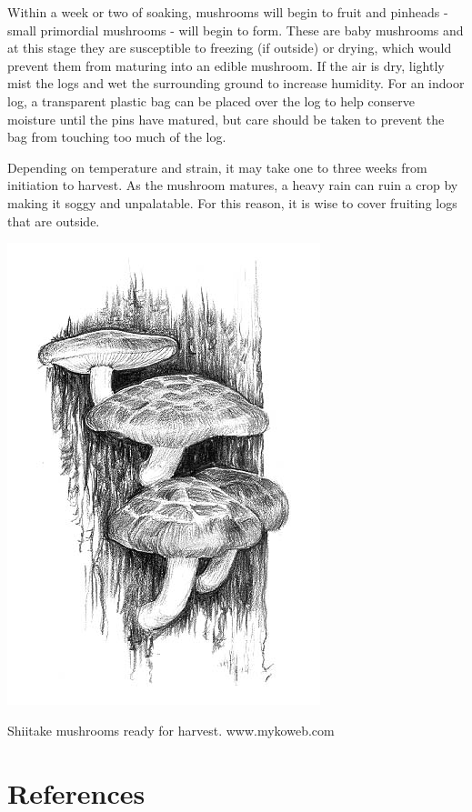 \documentclass{tufte-handout}
\begin{document}
Within a week or two of soaking, mushrooms will begin to fruit and pinheads - small primordial mushrooms - will begin to form. These are baby mushrooms and at this stage they are susceptible to freezing (if outside) or drying, which would prevent them from maturing into an edible mushroom. 
If the air is dry, lightly mist the logs and wet the surrounding ground to increase humidity.
For an indoor log, a transparent plastic bag can be placed over the log to help conserve moisture until the pins have matured, but care should be taken to prevent the bag from touching too much of the log.

Depending on temperature and strain, it may take one to three weeks from initiation to harvest. 
As the mushroom matures, a heavy rain can ruin a crop by making it soggy and unpalatable. 
For this reason, it is wise to cover fruiting logs that are outside. 

\begin{marginfigure}
\includegraphics{shiitake}
\caption{Shiitake mushrooms ready for harvest. www.mykoweb.com}
\end{marginfigure}

\section{References}
\end{document}
